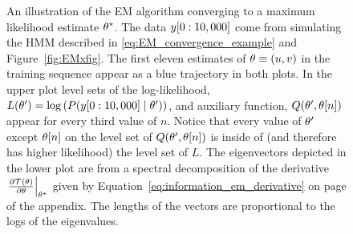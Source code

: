 \begin{figure}[htbp]
  \caption[An illustration of the EM algorithm.]%
  {An illustration of the EM algorithm converging to a maximum
    likelihood estimate ${\theta^*}$.  The data $y[0:10,000]$ come
    from simulating the HMM described in
    \eqref{eq:EM_convergence_example} and Figure~\ref{fig:EMxfig}.
    The first eleven estimates of $\theta\equiv(u,v)$ in the training
    sequence appear as a blue trajectory in both plots.  In the upper
    plot level sets of the log-likelihood,
    $L(\theta') = \log \left( P(y[0:10,000] \mid
      \theta')\right)$, and auxiliary function,
    $Q(\theta',{\theta}{[n]})$ appear for every third value of $n$.
    Notice that every value of $\theta'$ except ${\theta}{[n]}$ on
    the level set of $Q(\theta',{\theta}{[n]})$ is inside of (and
    therefore has higher likelihood) the level set of $L$.  The
    eigenvectors depicted in the lower plot are from a spectral
    decomposition of the derivative
    $\left.  \frac{\partial \EMmap(\parameters)}{\partial\parameters}
    \right|_{\EMfixedPoint}$ given by
    Equation~\eqref{eq:information_em_derivative} on page
    \pageref{eq:information_em_derivative} of the appendix.  The
    lengths of the vectors are proportional to the logs of the
    eigenvalues.}
  \label{fig:EM}
\end{figure}


